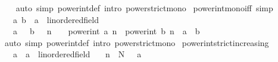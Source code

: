 \begin{isabellebody}
%
\isadelimproof
\ \ %
\endisadelimproof
%
\isatagproof
{}\isamarkupfalse%
\ {\isacharparenleft}{\kern0pt}auto\ simp{\isacharcolon}{\kern0pt}\ power{\isacharunderscore}{\kern0pt}int{\isacharunderscore}{\kern0pt}def\ intro{\isacharbang}{\kern0pt}{\isacharcolon}{\kern0pt}\ power{\isacharunderscore}{\kern0pt}strict{\isacharunderscore}{\kern0pt}mono{\isacharparenright}{\kern0pt}%
\endisatagproof
{\isafoldproof}%
%
\isadelimproof
\isanewline
%
\endisadelimproof
\isanewline
{}\isamarkupfalse%
\ power{\isacharunderscore}{\kern0pt}int{\isacharunderscore}{\kern0pt}mono{\isacharunderscore}{\kern0pt}iff\ {\isacharbrackleft}{\kern0pt}simp{\isacharbrackright}{\kern0pt}{\isacharcolon}{\kern0pt}\isanewline
\ \ \ a\ b\ {\isacharcolon}{\kern0pt}{\isacharcolon}{\kern0pt}\ {\isachardoublequoteopen}{\isacharprime}{\kern0pt}a\ {\isacharcolon}{\kern0pt}{\isacharcolon}{\kern0pt}\ linordered{\isacharunderscore}{\kern0pt}field{\isachardoublequoteclose}\isanewline
\ \ \ {\isachardoublequoteopen}{\isasymlbrakk}a\ {\isasymge}\ {}{\isacharsemicolon}{\kern0pt}\ b\ {\isasymge}\ {}{\isacharsemicolon}{\kern0pt}\ n\ {\isachargreater}{\kern0pt}\ {}{\isasymrbrakk}\ {\isasymLongrightarrow}\ power{\isacharunderscore}{\kern0pt}int\ a\ n\ {\isasymle}\ power{\isacharunderscore}{\kern0pt}int\ b\ n\ {\isasymlongleftrightarrow}\ a\ {\isasymle}\ b{\isachardoublequoteclose}\isanewline
%
\isadelimproof
\ \ %
\endisadelimproof
%
\isatagproof
{}\isamarkupfalse%
\ {\isacharparenleft}{\kern0pt}auto\ simp{\isacharcolon}{\kern0pt}\ power{\isacharunderscore}{\kern0pt}int{\isacharunderscore}{\kern0pt}def\ intro{\isacharbang}{\kern0pt}{\isacharcolon}{\kern0pt}\ power{\isacharunderscore}{\kern0pt}strict{\isacharunderscore}{\kern0pt}mono{\isacharparenright}{\kern0pt}%
\endisatagproof
{\isafoldproof}%
%
\isadelimproof
\isanewline
%
\endisadelimproof
\isanewline
{}\isamarkupfalse%
\ power{\isacharunderscore}{\kern0pt}int{\isacharunderscore}{\kern0pt}strict{\isacharunderscore}{\kern0pt}increasing{\isacharcolon}{\kern0pt}\isanewline
\ \ \ a\ {\isacharcolon}{\kern0pt}{\isacharcolon}{\kern0pt}\ {\isachardoublequoteopen}{\isacharprime}{\kern0pt}a\ {\isacharcolon}{\kern0pt}{\isacharcolon}{\kern0pt}\ linordered{\isacharunderscore}{\kern0pt}field{\isachardoublequoteclose}\isanewline
\ \ \ {\isachardoublequoteopen}n\ {\isacharless}{\kern0pt}\ N{\isachardoublequoteclose}\ {\isachardoublequoteopen}{}\ {\isacharless}{\kern0pt}\ a{\isachardoublequoteclose}\isanewline

\end{isabellebody}
